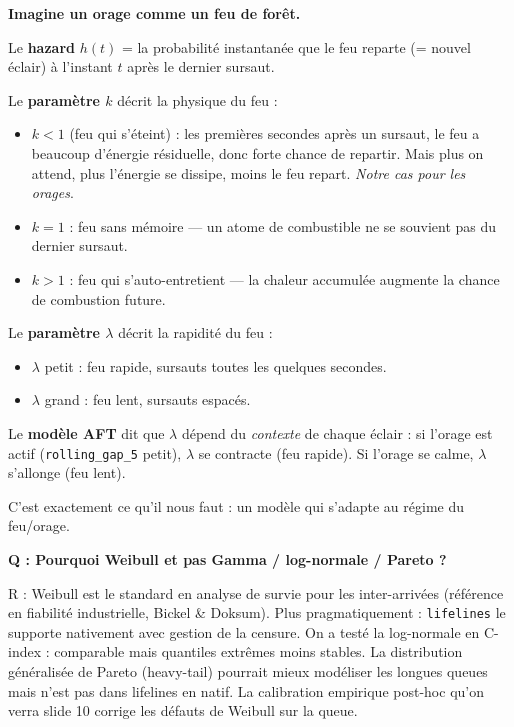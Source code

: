 \documentclass[11pt,a4paper]{article}
\begin{document}
\begin{tcolorbox}[colback=purple!5,colframe=purple!50!black,title=\textbf{Analogie complète : Weibull en une image}]
\textbf{Imagine un orage comme un feu de forêt.}

Le \textbf{hazard} $h(t)$ = la probabilité instantanée que le feu \og reparte \fg{}
(= nouvel éclair) à l'instant $t$ après le dernier sursaut.

Le \textbf{paramètre $k$} décrit la \og physique \fg{} du feu :
\begin{itemize}[topsep=2pt]
    \item $k < 1$ (feu qui s'éteint) : les premières secondes après un sursaut, le feu
    a beaucoup d'énergie résiduelle, donc forte chance de repartir. Mais plus on attend,
    plus l'énergie se dissipe, moins le feu repart. \emph{Notre cas pour les orages}.
    \item $k = 1$ : feu sans mémoire — un atome de combustible ne se \og souvient \fg{} pas
    du dernier sursaut.
    \item $k > 1$ : feu qui s'auto-entretient — la chaleur accumulée augmente la chance
    de combustion future.
\end{itemize}

Le \textbf{paramètre $\lambda$} décrit la \og rapidité \fg{} du feu :
\begin{itemize}[topsep=2pt]
    \item $\lambda$ petit : feu rapide, sursauts toutes les quelques secondes.
    \item $\lambda$ grand : feu lent, sursauts espacés.
\end{itemize}

Le \textbf{modèle AFT} dit que $\lambda$ dépend du \emph{contexte} de chaque éclair :
si l'orage est actif (\texttt{rolling\_gap\_5} petit), $\lambda$ se contracte (feu rapide).
Si l'orage se calme, $\lambda$ s'allonge (feu lent).

C'est exactement ce qu'il nous faut : un modèle qui s'adapte au régime du feu/orage.
\end{tcolorbox}

\begin{piege}
\textbf{Q : Pourquoi Weibull et pas Gamma / log-normale / Pareto ?}

R : Weibull est le standard en analyse de survie pour les inter-arrivées (référence en
fiabilité industrielle, Bickel \& Doksum). Plus pragmatiquement : \texttt{lifelines} le
supporte nativement avec gestion de la censure. On a testé la log-normale en C-index :
comparable mais quantiles extrêmes moins stables. La distribution généralisée de Pareto
(heavy-tail) pourrait mieux modéliser les longues queues mais n'est pas dans lifelines
en natif. La calibration empirique post-hoc qu'on verra slide 10 corrige les défauts de
Weibull sur la queue.
\end{piege}
\end{document}
